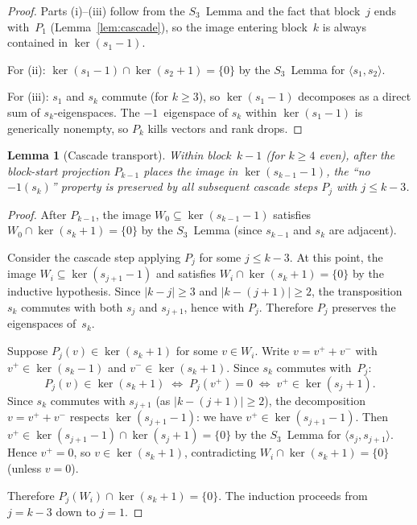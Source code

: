 \documentclass[12pt]{article}
\newtheorem{lemma}[theorem]{Lemma}
\theoremstyle{definition}
\theoremstyle{remark}
\begin{document}
\begin{proof}
Parts (i)--(iii) follow from the $S_3$~Lemma and the fact that block~$j$ ends with~$P_1$
(Lemma~\ref{lem:cascade}), so the image entering block~$k$ is always contained
in $\ker(s_1 - 1)$.

For (ii): $\ker(s_1 - 1) \cap \ker(s_2 + 1) = \{0\}$ by the $S_3$~Lemma for
$\langle s_1, s_2 \rangle$.

For (iii): $s_1$ and $s_k$ commute (for $k \ge 3$), so $\ker(s_1 - 1)$ decomposes
as a direct sum of $s_k$-eigenspaces.  The $-1$~eigenspace of $s_k$ within
$\ker(s_1 - 1)$ is generically nonempty, so $P_k$ kills vectors and rank drops.
\end{proof}

\begin{lemma}[Cascade transport]
\label{lem:cascade-transport}
Within block~$k{-}1$ (for $k \ge 4$ even), after the block-start projection $P_{k-1}$
places the image in $\ker(s_{k-1} - 1)$, the ``no $-1(s_k)$'' property is preserved
by all subsequent cascade steps $P_j$ with $j \le k - 3$.
\end{lemma}

\begin{proof}
After $P_{k-1}$, the image $W_0 \subseteq \ker(s_{k-1} - 1)$ satisfies
$W_0 \cap \ker(s_k + 1) = \{0\}$ by the $S_3$~Lemma (since $s_{k-1}$ and $s_k$
are adjacent).

Consider the cascade step applying $P_j$ for some $j \le k - 3$.  At this point,
the image $W_i \subseteq \ker(s_{j+1} - 1)$ and satisfies $W_i \cap \ker(s_k + 1) = \{0\}$
by the inductive hypothesis.  Since $|k - j| \ge 3$ and $|k - (j+1)| \ge 2$,
the transposition $s_k$ commutes with both $s_j$ and $s_{j+1}$, hence with $P_j$.
Therefore $P_j$ preserves the eigenspaces of~$s_k$.

Suppose $P_j(v) \in \ker(s_k + 1)$ for some $v \in W_i$.  Write $v = v^+ + v^-$
with $v^+ \in \ker(s_k - 1)$ and $v^- \in \ker(s_k + 1)$.  Since $s_k$ commutes
with~$P_j$:
\[
  P_j(v) \in \ker(s_k + 1) \;\Longleftrightarrow\; P_j(v^+) = 0
  \;\Longleftrightarrow\; v^+ \in \ker(s_j + 1).
\]
Since $s_k$ commutes with $s_{j+1}$ (as $|k - (j+1)| \ge 2$), the decomposition
$v = v^+ + v^-$ respects $\ker(s_{j+1} - 1)$: we have $v^+ \in \ker(s_{j+1} - 1)$.
Then $v^+ \in \ker(s_{j+1} - 1) \cap \ker(s_j + 1) = \{0\}$ by the $S_3$~Lemma
for $\langle s_j, s_{j+1} \rangle$.  Hence $v^+ = 0$, so $v \in \ker(s_k + 1)$,
contradicting $W_i \cap \ker(s_k + 1) = \{0\}$ (unless $v = 0$).

Therefore $P_j(W_i) \cap \ker(s_k + 1) = \{0\}$.  The induction proceeds from
$j = k-3$ down to $j = 1$.
\end{proof}
\end{document}
